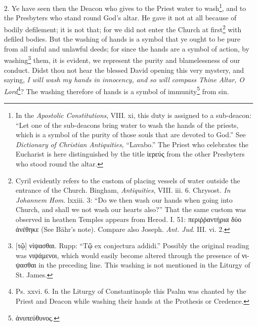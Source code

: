 2. Ye have seen then the Deacon who gives to the Priest water to wash\footnote{In the \emph{Apostolic Constitutions}, VIII. xi, this duty is assigned to a sub-deacon: “Let one of the sub-deacons bring water to wash the hands of the priests, which is a symbol of the purity of those souls that are devoted to God.” See \emph{Dictionary of Christian Antiquities,} “Lavabo.” The Priest who celebrates the Eucharist is here distinguished by the title \textgreek{ἱερεύς} from the other Presbyters who stood round the altar.}, and to the Presbyters who stand round God’s altar. He gave it not at all because of bodily defilement; it is not that; for we did not enter the Church at first\footnote{Cyril evidently refers to the custom of placing vessels of water outside the entrance of the Church. Bingham, \emph{Antiquities}, VIII. iii. 6. Chrysost. \emph{In Johannem Hom}. lxxiii. 3: “Do we then wash our hands when going into Church, and shall we not wash our hearts also?” That the same custom was observed in heathen Temples appears from Herod. I. 51: \textgreek{περιῤῥαντήρια δύο ἀνέθηκε} (See Bähr’s note). Compare also Joseph. \emph{Ant. Jud}. III. vi. 2.} with defiled bodies. But the washing of hands is a symbol that ye ought to be pure from all sinful and unlawful deeds; for since the hands are a symbol of action, by washing\footnote{\textgreek{[τῷ] νίψασθαι}. Rupp: “\textgreek{Τῷ} ex conjectura addidi.” Possibly the original reading was \textgreek{νιψάμενοι}, which would easily become altered through the presence of \textgreek{νιψασθαι} in the preceding line. This washing is not mentioned in the Liturgy of St. James.} them, it is evident, we represent the purity and blamelessness of our conduct. Didst thou not hear the blessed David opening this very mystery, and saying, \emph{I will wash my hands in innocency, and so will compass Thine Altar, O Lord}\footnote{Ps. xxvi. 6. In the Liturgy of Constantinople this Psalm was chanted by the Priest and Deacon while washing their hands at the Prothesis or Credence.}? The washing therefore of hands is a symbol of immunity\footnote{\textgreek{ἀνυπεύθυνος}.} from sin.

